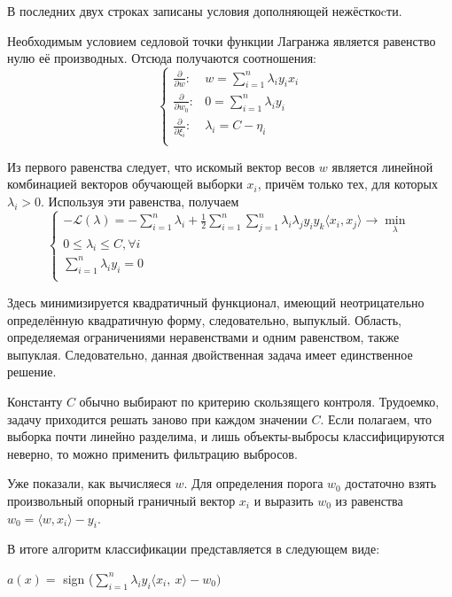 \documentclass[12pt]{article}
\begin{document}
	В последних двух строках записаны условия дополняющей нежёсткоcти.
	
	\newpage
	
	Необходимым условием седловой точки функции Лагранжа является равенство
	нулю её производных. Отсюда получаются соотношения:
	$$
	\begin{cases}
		\frac{\partial}{\partial w}: & w = \sum\limits_{i=1}^{n}\lambda_i y_i x_i \\
		\frac{\partial}{\partial w_0}: & 0=\sum\limits_{i=1}^{n}\lambda_i y_i \\
		\frac{\partial}{\partial \xi_i}: & \lambda_i=C-\eta_i \\
	\end{cases}
	$$

	Из первого равенства следует, что искомый вектор весов $w$ является линейной комбинацией векторов обучающей выборки $x_i$, причём только тех, для которых $\lambda_i > 0$. Используя эти равенства, получаем
	$$
	\begin{cases}
		-\mathcal{L}(\lambda)=-\sum\limits_{i=1}^n\lambda_i+\frac{1}{2}\sum\limits_{i=1}^{n}\sum\limits_{j=1}^{n}\lambda_i\lambda_j y_i y_k \langle x_i,  x_j \rangle \rightarrow \min\limits_{\lambda} \\
		0 \leq \lambda_i \leq C, \forall i \\
		\sum\limits_{i=1}^{n}\lambda_i y_i=0 \\
	\end{cases}
	$$
	
	Здесь минимизируется квадратичный функционал, имеющий неотрицательно
	определённую квадратичную форму, следовательно, выпуклый. Область, определяемая ограничениями неравенствами и одним равенством, также выпуклая. Следовательно, данная двойственная задача имеет единственное решение. 
	
	Константу $C$ обычно выбирают по критерию скользящего контроля. Трудоемко, задачу приходится решать заново при каждом значении $C$. Если полагаем, что выборка почти линейно разделима, и лишь объекты-выбросы классифицируются неверно, то можно применить фильтрацию выбросов. 
	
	Уже показали, как вычисляеся $w$. Для определения порога $w_0$ достаточно взять произвольный опорный граничный вектор $x_i$ и выразить $w_0$ из равенства $w_{0}=\langle w, x_{i}\rangle-y_{i}$.
	
	В итоге алгоритм классификации представляется в следующем виде:
	
	\begin{center}
		$a(x)=$ sign ($\displaystyle \sum_{i=1}^{n}\lambda_{i}y_{i}\langle x_{i},\ x\rangle-w_{0})$
	\end{center} 
	
\end{document}
